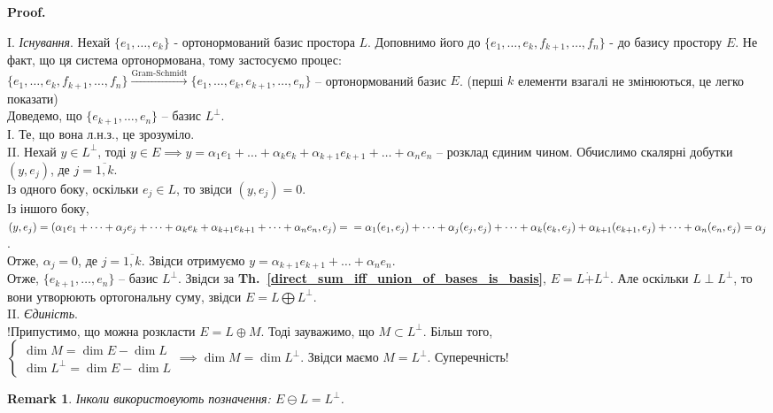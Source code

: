 \documentclass[a4paper, 10pt]{article}
\makeatletter
\theoremstyle{theoremdd}
\newtheorem{remark}[theorem]{Remark}
\newcommand\thref[1]{\textbf{Th.~\ref{#1}}}
\renewenvironment{proof}[1][Proof.\\]{\par
\pushQED{\hfill \qed}%
\normalfont \topsep6\p@\@plus6\p@\relax
\trivlist
\item\relax
{\bfseries
#1\@addpunct{.}}\hspace\labelsep\ignorespaces
}{%
\popQED\endtrivlist\@endpefalse
}
\makeatother
\begin{document}
\begin{proof}
I. \textit{Існування}.
Нехай $\{e_1,\dots,e_k\}$ - ортонормований базис простора $L$. Доповнимо його до $\{e_1,\dots,e_k,f_{k+1},\dots,f_n\}$ - до базису простору $E$. Не факт, що ця система ортонормована, тому застосуємо процес:\\
$\{e_1,\dots,e_k,f_{k+1},\dots, f_n\} \xrightarrow{\text{Gram-Schmidt}} \{e_1,\dots,e_k, e_{k+1},\dots,e_n\}$ -- ортонормований базис $E$. (перші $k$ елементи взагалі не змінюються, це легко показати)\\
Доведемо, що $\{e_{k+1},\dots, e_n\}$ -- базис $L^\perp$.\\
І. Те, що вона л.н.з., це зрозуміло.\\
II. Нехай $y \in L^\perp$, тоді $y \in E \implies y = \alpha_1 e_1 + \dots + \alpha_k e_k + \alpha_{k+1} e_{k+1} + \dots + \alpha_n e_n$ -- розклад єдиним чином. Обчислимо скалярні добутки $(y,e_j)$, де $j=\overline{1,k}$.\\
Із одного боку, оскільки $e_j \in L$, то звідси $(y,e_j) = 0$.\\
Із іншого боку, $(y,e_j) = (\alpha_1 e_1 + \dots + \alpha_j e_j + \dots + \alpha_k e_k + \alpha_{k+1} e_{k+1} + \dots + \alpha_n e_n, e_j) = \\
= \alpha_1 (e_1,e_j) + \dots + \alpha_j (e_j,e_j) + \dots + \alpha_k (e_k,e_j) + \alpha_{k+1} (e_{k+1},e_j) + \dots + \alpha_n (e_n,e_j) = \alpha_j$.\\
Отже, $\alpha_j = 0$, де $j=\overline{1,k}$. Звідси отримуємо $y = \alpha_{k+1} e_{k+1} + \dots + \alpha_n e_n$.\\
Отже, $\{e_{k+1},\dots, e_n\}$ -- базис $L^\perp$. Звідси за \thref{direct_sum_iff_union_of_bases_is_basis}, $E= L \dot{+} L^{\perp}$. Але оскільки $
L \perp L^\perp$, то вони утворюють ортогональну суму, звідси $E = L \bigoplus L^\perp$.
\bigskip \\
II. \textit{Єдиність}.\\
!Припустимо, що можна розкласти $E = L \oplus M$. Тоді зауважимо, що $M \subset L^\perp$. Більш того, \\ $\begin{cases}
\dim M = \dim E - \dim L \\
\dim L^{\perp} = \dim E - \dim L
\end{cases} \implies \dim M = \dim L^\perp$. Звідси маємо $M = L^\perp$. Суперечність!
\end{proof}

\begin{remark}
Інколи використовують позначення: $E \ominus L = L^{\perp}$.
\end{remark}
\end{document}
